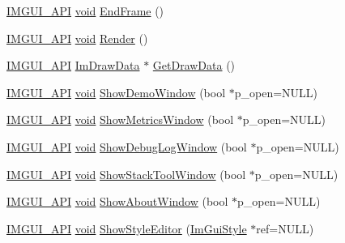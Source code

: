 \begin{DoxyCompactItemize}
\item 
\hyperlink{imgui_8h_a43829975e84e45d1149597467a14bbf5}{I\+M\+G\+U\+I\+\_\+\+A\+PI} \hyperlink{imgui__impl__opengl3__loader_8h_ac668e7cffd9e2e9cfee428b9b2f34fa7}{void} \hyperlink{namespaceImGui_a246c37da45e88a12ade440a0feacb4ee}{End\+Frame} ()
\item 
\hyperlink{imgui_8h_a43829975e84e45d1149597467a14bbf5}{I\+M\+G\+U\+I\+\_\+\+A\+PI} \hyperlink{imgui__impl__opengl3__loader_8h_ac668e7cffd9e2e9cfee428b9b2f34fa7}{void} \hyperlink{namespaceImGui_ab51a164f547317c16c441f1599e3946d}{Render} ()
\item 
\hyperlink{imgui_8h_a43829975e84e45d1149597467a14bbf5}{I\+M\+G\+U\+I\+\_\+\+A\+PI} \hyperlink{structImDrawData}{Im\+Draw\+Data} $\ast$ \hyperlink{namespaceImGui_ab73131dc44b1267dac04f0c2bb0af983}{Get\+Draw\+Data} ()
\item 
\hyperlink{imgui_8h_a43829975e84e45d1149597467a14bbf5}{I\+M\+G\+U\+I\+\_\+\+A\+PI} \hyperlink{imgui__impl__opengl3__loader_8h_ac668e7cffd9e2e9cfee428b9b2f34fa7}{void} \hyperlink{namespaceImGui_a0b019f56bd12df4f8ee3613fb29a61ff}{Show\+Demo\+Window} (bool $\ast$p\+\_\+open=N\+U\+LL)
\item 
\hyperlink{imgui_8h_a43829975e84e45d1149597467a14bbf5}{I\+M\+G\+U\+I\+\_\+\+A\+PI} \hyperlink{imgui__impl__opengl3__loader_8h_ac668e7cffd9e2e9cfee428b9b2f34fa7}{void} \hyperlink{namespaceImGui_afe7a28c6eb52fff3cc27d5a698fea4ff}{Show\+Metrics\+Window} (bool $\ast$p\+\_\+open=N\+U\+LL)
\item 
\hyperlink{imgui_8h_a43829975e84e45d1149597467a14bbf5}{I\+M\+G\+U\+I\+\_\+\+A\+PI} \hyperlink{imgui__impl__opengl3__loader_8h_ac668e7cffd9e2e9cfee428b9b2f34fa7}{void} \hyperlink{namespaceImGui_af1b39e70cac2e1b9e62dd3c9d154cbd6}{Show\+Debug\+Log\+Window} (bool $\ast$p\+\_\+open=N\+U\+LL)
\item 
\hyperlink{imgui_8h_a43829975e84e45d1149597467a14bbf5}{I\+M\+G\+U\+I\+\_\+\+A\+PI} \hyperlink{imgui__impl__opengl3__loader_8h_ac668e7cffd9e2e9cfee428b9b2f34fa7}{void} \hyperlink{namespaceImGui_a5866840f58a4cc09a4fd5f1929a368e5}{Show\+Stack\+Tool\+Window} (bool $\ast$p\+\_\+open=N\+U\+LL)
\item 
\hyperlink{imgui_8h_a43829975e84e45d1149597467a14bbf5}{I\+M\+G\+U\+I\+\_\+\+A\+PI} \hyperlink{imgui__impl__opengl3__loader_8h_ac668e7cffd9e2e9cfee428b9b2f34fa7}{void} \hyperlink{namespaceImGui_af67015978351019804c9578dc5b13a5c}{Show\+About\+Window} (bool $\ast$p\+\_\+open=N\+U\+LL)
\item 
\hyperlink{imgui_8h_a43829975e84e45d1149597467a14bbf5}{I\+M\+G\+U\+I\+\_\+\+A\+PI} \hyperlink{imgui__impl__opengl3__loader_8h_ac668e7cffd9e2e9cfee428b9b2f34fa7}{void} \hyperlink{namespaceImGui_a833bb48ec0108ce5c407c211fdb40275}{Show\+Style\+Editor} (\hyperlink{structImGuiStyle}{Im\+Gui\+Style} $\ast$ref=N\+U\+LL)

\end{DoxyCompactItemize}
